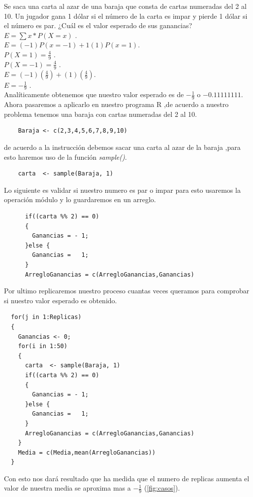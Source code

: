 \documentclass[]{article}
\begin{document}
Se saca una carta al azar de una baraja que consta de cartas numeradas del 2 al 10. Un jugador gana 1 dólar si el número de la carta es impar y pierde 1 dólar si el número es par. ¿Cuál es el valor esperado de sus ganancias?\\
$E = \sum x *P(X=x)$ .\\
$E = (-1)P(x=-1) + 1(1)P(x=1)$.\\
$P(X=1) = \frac{4}{9}$ .\\
$P(X=-1) = \frac{4}{9}$ .\\
$E = (-1)(\frac{4}{9}) +(1)(\frac{4}{9})$. \\
$E = -\frac{1}{9}$ .\\
Analíticamente obtenemos que nuestro valor esperado es de $-\frac{1}{9}$ o $-0.11111111$.
Ahora pasaremos a aplicarlo en nuestro programa R
,de acuerdo a nuestro problema tenemos una baraja con cartas numeradas del 2 al 10.
   \begin{lstlisting}
	Baraja <- c(2,3,4,5,6,7,8,9,10)
   \end{lstlisting}
de acuerdo a la instrucción debemos sacar una carta al azar de la baraja ,para esto haremos uso de la función \textit{sample()}.
   \begin{lstlisting}
	carta  <- sample(Baraja, 1)
   \end{lstlisting}
Lo siguiente es validar si nuestro numero es par o impar para esto usaremos la operación módulo y lo guardaremos en un arreglo.
   \begin{lstlisting}
      if((carta %% 2) == 0)
      {
        Ganancias = - 1;
      }else {
        Ganancias =   1;
      }
	  ArregloGanancias = c(ArregloGanancias,Ganancias)

   \end{lstlisting}
   Por ultimo replicaremos nuestro proceso cuantas veces queramos para comprobar si nuestro valor esperado es obtenido.
      \begin{lstlisting}
  for(j in 1:Replicas)
  {
    Ganancias <- 0;
    for(i in 1:50)
    {
      carta  <- sample(Baraja, 1)
      if((carta %% 2) == 0)
      {
        Ganancias = - 1;
      }else {
        Ganancias =   1;
      }
      ArregloGanancias = c(ArregloGanancias,Ganancias)
    }
    Media = c(Media,mean(ArregloGanancias))
  }

      \end{lstlisting}
      Con esto nos dará resultado que ha medida que el numero de replicas aumenta el valor de nuestra media se aproxima mas a $-\frac{1}{9}$ (\autoref{fig:casos}).
\end{document}
